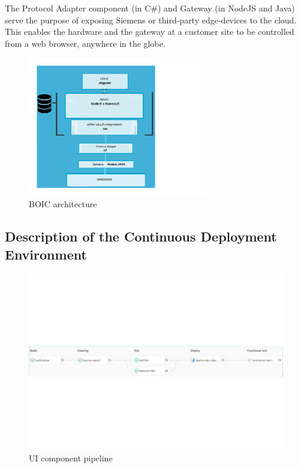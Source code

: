 \documentclass[conference]{IEEEtran}
\begin{document}
	The Protocol Adapter component (in C\#) and Gateway (in NodeJS and Java) serve the purpose of exposing Siemens or third-party edge-devices to the cloud. 
	This enables the hardware and the gateway at a customer site to be controlled from a web browser, anywhere in the globe.

\begin{figure}[!h]
		\includegraphics[width=0.70\textwidth,]{architecture.pdf}
	\caption{BOIC architecture}
	\label{fig:BOIC architecture}
\end{figure}

	\subsection{Description of the Continuous Deployment Environment }
	
	\begin{figure}[!t]
		\centering
			\includegraphics[width=1.00\textwidth]{UIpipeline.pdf}
		\caption{UI component pipeline}
		\label{fig:UIpipeline}
	\end{figure}
	
\end{document}
